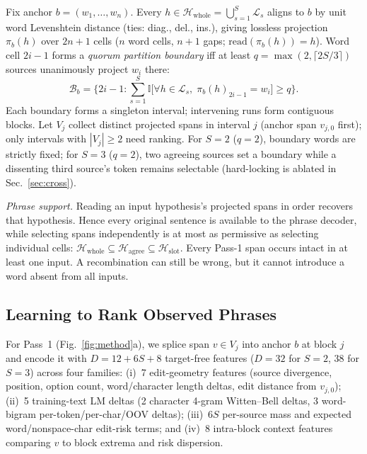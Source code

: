 \documentclass[conference,letterpaper]{IEEEtran}
\newcommand{\Hwhole}{\mathcal{H}_{\mathrm{whole}}}
\newcommand{\Hagree}{\mathcal{H}_{\mathrm{agree}}}
\newcommand{\Hslot}{\mathcal{H}_{\mathrm{slot}}}
\begin{document}
Fix anchor $b = (w_1,\dots,w_n)$. Every $h \in \Hwhole = \bigcup_{s=1}^S \mathcal{L}_s$ aligns to $b$ by unit word Levenshtein distance (ties: diag., del., ins.), giving lossless projection $\pi_b(h)$ over $2n+1$ cells ($n$ word cells, $n+1$ gaps; $\mathrm{read}(\pi_b(h))=h$). Word cell $2i-1$ forms a \emph{quorum partition boundary} iff at least $q=\max(2,\lceil 2S/3\rceil)$ sources unanimously project $w_i$ there:
\begin{equation}
\mathcal{B}_b = \Big\{2i-1 : \sum_{s=1}^S \mathbb{I}\big[\forall h \in \mathcal{L}_s,\; \pi_b(h)_{2i-1} = w_i\big] \ge q\Big\}.
\end{equation}
Each boundary forms a singleton interval; intervening runs form contiguous blocks. Let $V_j$ collect distinct projected spans in interval $j$ (anchor span $v_{j,0}$ first); only intervals with $|V_j| \ge 2$ need ranking. For $S=2$ ($q=2$), boundary words are strictly fixed; for $S=3$ ($q=2$), two agreeing sources set a boundary while a dissenting third source's token remains selectable (hard-locking is ablated in Sec.~\ref{sec:cross}).

\emph{Phrase support.} Reading an input hypothesis's projected spans in order recovers that hypothesis. Hence every original sentence is available to the phrase decoder, while selecting spans independently is at most as permissive as selecting individual cells: $\Hwhole\subseteq\Hagree\subseteq\Hslot$. Every Pass-1 span occurs intact in at least one input. A recombination can still be wrong, but it cannot introduce a word absent from all inputs.

\subsection{Learning to Rank Observed Phrases}
For Pass~1 (Fig.~\ref{fig:method}a), we splice span $v\in V_j$ into anchor $b$ at block $j$ and encode it with $D=12+6S+8$ target-free features ($D=32$ for $S=2$, $38$ for $S=3$) across four families: (i)~7 edit-geometry features (source divergence, position, option count, word/character length deltas, edit distance from $v_{j,0}$); (ii)~5 training-text LM deltas (2 character 4-gram Witten--Bell deltas, 3 word-bigram per-token/per-char/OOV deltas); (iii)~$6S$ per-source mass and expected word/nonspace-char edit-risk terms; and (iv)~8 intra-block context features comparing $v$ to block extrema and risk dispersion.
\end{document}
